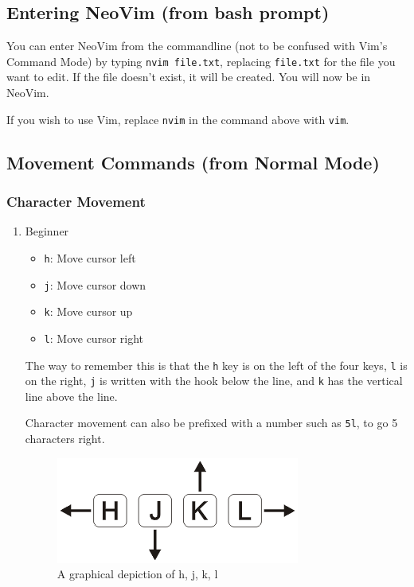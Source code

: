 \documentclass[11pt]{article}
\begin{document}
\subsection{Entering NeoVim (from bash prompt)}
\label{sec:org03e18ef}
You can enter NeoVim from the commandline (not to be confused with Vim's Command
Mode) by typing \texttt{nvim file.txt}, replacing \texttt{file.txt} for the file you want to
edit. If the file doesn't exist, it will be created. You will now be in NeoVim.

If you wish to use Vim, replace \texttt{nvim} in the command above with \texttt{vim}.
\subsection{Movement Commands (from Normal Mode)}
\label{sec:orge984ec0}
\subsubsection{Character Movement}
\label{sec:orgf740cfa}
\begin{enumerate}
\item Beginner
\label{sec:orge3efcca}
\begin{itemize}
\item \texttt{h}: Move cursor left
\item \texttt{j}: Move cursor down
\item \texttt{k}: Move cursor up
\item \texttt{l}: Move cursor right
\end{itemize}

The way to remember this is that the \texttt{h} key is on the left of the four keys,
\texttt{l} is on the right, \texttt{j} is written with the hook below the line, and \texttt{k} has
the vertical line above the line.

Character movement can also be prefixed with a number such as \texttt{5l}, to go 5
characters right.

\begin{figure}[htbp]
\centering
\includegraphics[width=.9\linewidth]{./hjkl.png}
\caption{\label{fig:org602cb9f}
A graphical depiction of h, j, k, l}
\end{figure}
\end{enumerate}
\end{document}

